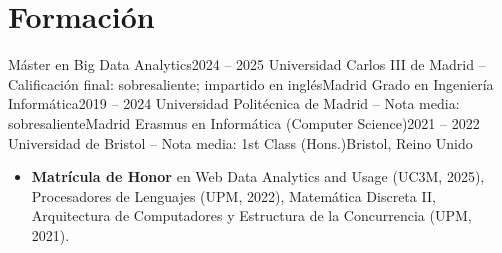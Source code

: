 \section{Formación}
  \resumeSubHeadingListStart
    \resumeSubheading
      {Máster en Big Data Analytics}{2024 -- 2025}
      {Universidad Carlos III de Madrid -- Calificación final: sobresaliente; impartido en inglés}{Madrid}
    \resumeSubheading
      {Grado en Ingeniería Informática}{2019 -- 2024}
      {Universidad Politécnica de Madrid -- Nota media: sobresaliente}{Madrid}
    \resumeSubheading
      {Erasmus en Informática (Computer Science)}{2021 -- 2022}
      {Universidad de Bristol -- Nota media: 1st Class (Hons.)}{Bristol, Reino Unido}
  \resumeSubHeadingListEnd
  \vspace{-2pt}
  \begin{itemize}[leftmargin=0.15in, label={}]
    \small\item \textbf{Matrícula de Honor} en Web Data Analytics and Usage (UC3M, 2025), Procesadores de Lenguajes (UPM, 2022), Matemática Discreta II, Arquitectura de Computadores y Estructura de la Concurrencia (UPM, 2021).
  \end{itemize}

